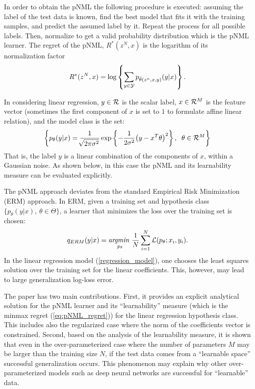 \documentclass[conference,letterpaper]{IEEEtran}
\def\pNMLSingle{p_{\hat{\theta}(z^n,x,y)} (y|x)}
\begin{document}
In order to obtain the pNML the following procedure is executed: assuming the label of the test data is known, find the best model that fits it with the training samples, and predict the assumed label by it. 
Repeat the process for all possible labels. 
Then, normalize to get a valid probability distribution which is the pNML learner.
The regret of the pNML, $R^*(z^N,x)$ is the logarithm of its normalization factor
\begin{equation} \label{eq:pNML_regret}
R^*(z^N,x) = \log \left\{ \sum_{y\in {\cal Y}} \pNMLSingle \right\}.
\end{equation}

In considering linear regression, $y\in {\cal R}$ is the scalar label, $x\in {\cal R}^M$ is the feature vector (sometimes the first component of $x$ is set to $1$ to formulate affine linear relation), and the model class is the set:
\begin{equation} \label{regression_model}
\left\{ p_{\theta}(y|x) 
=\frac{1}{\sqrt[]{2\pi\sigma^2}}\exp\left\{-\frac{1}{2\sigma^2}\big(y- x^T\theta \big)^2\right\}, \;\; \theta \in {\cal R}^M \right\} 
\end{equation}
That is, the label $y$ is a linear combination of the components of $x$, within a Gaussian noise. As shown below, in this case the pNML and its learnability measure can be evaluated explicitly.

The pNML approach deviates from the standard Empirical Risk Minimization (ERM) \cite{vapnik1992principles} approach.
In ERM, given a training set and hypothesis class $\{p_\theta(y|x),\ \theta \in \Theta\}$, a learner that minimizes the loss over the training set is chosen:
\begin{equation}
q_{\mbox{\tiny{ERM}}}(y|x) = \underset{p_\theta}{\textit{argmin }} \frac{1}{N}\sum_{i=1}^{N}  \mathcal{L}(p_\theta; x_i, y_i).
\end{equation}
In the linear regression model (\ref{regression_model}), one chooses the least squares solution over the training set for the linear coefficients. 
This, however, may lead to large generalization log-loss error.

The paper has two main contributions.
First, it provides an explicit analytical solution for the pNML learner and its ``learnability'' measure (which is the minmax regret (\ref{eq:pNML_regret})) for the linear regression hypothesis class. This includes also the regularized case where the norm of the coefficients vector is constrained. Second, based on the analysis of the learnability measure, it is shown that even in the over-parameterized case where the number of parameters $M$ may be larger than the training size $N$, if the test data comes from a ``learnable space'' successful generalization occurs.
This phenomenon may explain why other over-parameterized models such as deep neural networks are successful for ``learnable'' data.
\end{document}
